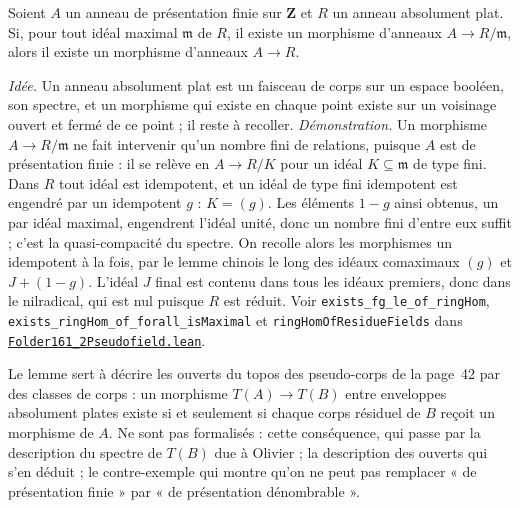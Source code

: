 \begin{encadre}
\begin{enonce}
Soient $A$ un anneau de présentation finie sur $\mathbf Z$ et $R$ un anneau absolument plat. Si, pour tout idéal maximal $\mathfrak m$ de $R$, il existe un morphisme d'anneaux $A \to R/\mathfrak m$, alors il existe un morphisme d'anneaux $A \to R$.
\end{enonce}
\end{encadre}
{\small \emph{Idée.} Un anneau absolument plat est un faisceau de corps sur un espace booléen, son spectre, et un morphisme qui existe en chaque point existe sur un voisinage ouvert et fermé de ce point ; il reste à recoller. \emph{Démonstration.} Un morphisme $A \to R/\mathfrak m$ ne fait intervenir qu'un nombre fini de relations, puisque $A$ est de présentation finie : il se relève en $A \to R/K$ pour un idéal $K \subseteq \mathfrak m$ de type fini. Dans $R$ tout idéal est idempotent, et un idéal de type fini idempotent est engendré par un idempotent $g$ : $K = (g)$. Les éléments $1 - g$ ainsi obtenus, un par idéal maximal, engendrent l'idéal unité, donc un nombre fini d'entre eux suffit ; c'est la quasi-compacité du spectre. On recolle alors les morphismes un idempotent à la fois, par le lemme chinois le long des idéaux comaximaux $(g)$ et $J + (1 - g)$. L'idéal $J$ final est contenu dans tous les idéaux premiers, donc dans le nilradical, qui est nul puisque $R$ est réduit. Voir \texttt{exists\_fg\_le\_of\_ringHom}, \texttt{exists\_ringHom\_of\_forall\_isMaximal} et \texttt{ringHomOfResidueFields} dans \href{\leanblobmain/RingTheory/Folder161_2Pseudofield.lean}{\texttt{Folder161\_2Pseudofield.\allowbreak{}lean}}.

Le lemme sert à décrire les ouverts du topos des pseudo-corps de la page~42 par des classes de corps : un morphisme $T(A) \to T(B)$ entre enveloppes absolument plates existe si et seulement si chaque corps résiduel de $B$ reçoit un morphisme de $A$. Ne sont pas formalisés : cette conséquence, qui passe par la description du spectre de $T(B)$ due à Olivier ; la description des ouverts qui s'en déduit ; le contre-exemple qui montre qu'on ne peut pas remplacer « de présentation finie » par « de présentation dénombrable ».\par}
